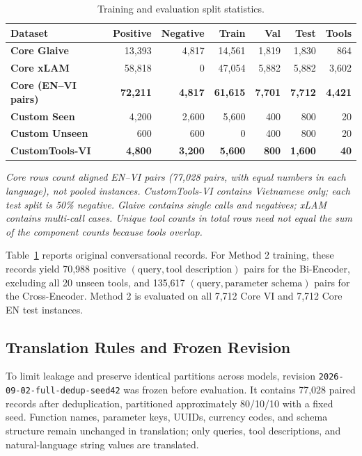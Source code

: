 \documentclass[10pt,twocolumn,a4paper]{article}
\newcommand{\tabletext}{\small}
\begin{document}
\begin{table}[htbp]
    \centering
    \caption{Training and evaluation split statistics.}
    \label{tab:datasets}
    \tabletext
    \begin{tabular*}{\textwidth}{@{\extracolsep{\fill}}lrrrrrr@{}}
        \toprule
        \textbf{Dataset} & \textbf{Positive} & \textbf{Negative} & \textbf{Train} & \textbf{Val} & \textbf{Test} & \textbf{Tools} \\
        \midrule
        \textbf{Core Glaive} & 13,393 & 4,817 & 14,561 & 1,819 & 1,830 & 864 \\
        \textbf{Core xLAM} & 58,818 & 0 & 47,054 & 5,882 & 5,882 & 3,602 \\
        \textbf{Core (EN--VI pairs)} & \textbf{72,211} & \textbf{4,817} & \textbf{61,615} & \textbf{7,701} & \textbf{7,712} & \textbf{4,421} \\
        \midrule
        \textbf{Custom Seen} & 4,200 & 2,600 & 5,600 & 400 & 800 & 20 \\
        \textbf{Custom Unseen} & 600 & 600 & 0 & 400 & 800 & 20 \\
        \textbf{CustomTools-VI} & \textbf{4,800} & \textbf{3,200} & \textbf{5,600} & \textbf{800} & \textbf{1,600} & \textbf{40} \\
        \bottomrule
    \end{tabular*}
    \par\medskip
    \begin{minipage}{\textwidth}\footnotesize\itshape
    Core rows count aligned EN--VI pairs (77,028 pairs, with equal numbers in each language), not pooled instances. CustomTools-VI contains Vietnamese only; each test split is 50\% negative. Glaive contains single calls and negatives; xLAM contains multi-call cases. Unique tool counts in total rows need not equal the sum of the component counts because tools overlap.
    \end{minipage}
\end{table}

Table~\ref{tab:datasets} reports original conversational records. For Method 2 training, these records yield 70,988 positive $(\text{query},\text{tool description})$ pairs for the Bi-Encoder, excluding all 20 unseen tools, and 135,617 $(\text{query},\text{parameter schema})$ pairs for the Cross-Encoder. Method 2 is evaluated on all 7,712 Core VI and 7,712 Core EN test instances.

\subsection{Translation Rules and Frozen Revision}
\label{sec:translation}
To limit leakage and preserve identical partitions across models, revision \texttt{2026-09-02-full-dedup-seed42} was frozen before evaluation. It contains 77,028 paired records after deduplication, partitioned approximately 80/10/10 with a fixed seed. Function names, parameter keys, UUIDs, currency codes, and schema structure remain unchanged in translation; only queries, tool descriptions, and natural-language string values are translated.
\end{document}
